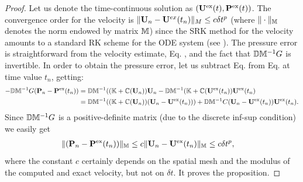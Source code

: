 \begin{proof}
Let us denote the time-continuous solution as $({\bf U}^{\rm ex}(t),{\bf P}^{\rm ex}(t))$. The convergence order for the velocity is $\| {\bf U}_n - {\bf U}^{ex}(t_n)\|_{M} \leq c \delta t^{p}$ (where $\| \cdot \|_{\mathbb{M}}$ denotes the norm endowed by matrix $\mathbb{M}$) since the SRK method for the velocity amounts to a standard RK scheme for the ODE system  (see \cite{hairer_solving_2008}). The pressure error is straightforward from the velocity estimate, Eq. , and the fact that $\mathbb{D}\mathbb{M}^{-1}G$ is invertible. 
In order to obtain the pressure error, let us subtract Eq.  from Eq.  at time value $t_n$, getting:
\begin{align*}
- \mathbb{D}\mathbb{M}^{-1}G({\bf P}_{n} - {\bf P}^{\rm ex}(t_{n}))& = \mathbb{D}\mathbb{M}^{-1}((\mathbb{K}+\mathbb{C}({\bf U}_{n})){\bf U}_{n} - \mathbb{D}\mathbb{M}^{-1}(\mathbb{K}+\mathbb{C}({\bf U}^{\rm ex}(t_{n})){\bf U}^{\rm ex}(t_{n}) \\
 & = \mathbb{D}\mathbb{M}^{-1}((\mathbb{K}+\mathbb{C}({\bf U}_{n}))({\bf U}_{n} - {\bf U}^{\rm ex}(t_{n}))) + \mathbb{D}\mathbb{M}^{-1}C({\bf U}_{n} - {\bf U}^{\rm ex}(t_{n})){\bf U}^{\rm ex}(t_{n}).
\end{align*}
Since $\mathbb{D}\mathbb{M}^{-1} G$ is a positive-definite matrix (due to the discrete inf-sup condition) we easily get
\begin{align*}
\| ({\bf P}_{n} - {\bf P}^{\rm ex}(t_{n}))\|_{\mathbb{M}} &  \leq c \| {\bf U}_{n} - {\bf U}^{\rm ex}(t_{n}) \|_{\mathbb{M}} \leq c \delta t^{p},
\end{align*}
where the constant $c$ certainly depends on the spatial mesh and the modulus of the computed and exact velocity, but not on $\delta t$. It proves the proposition.
%
%
%
%
\end{proof}



